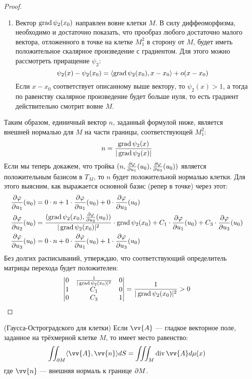 \begin{proof}
\begin{enumerate}
		\item Вектор $\operatorname{grad} \psi_2(x_0)$ направлен вовне клетки $M$. В силу диффеоморфизма, необходимо и достаточно показать, что прообраз любого достаточно малого вектора, отложенного в точке на клетке $M_1^2$ в сторону от $M$, будет иметь положительное скалярное произведение с градиентом. Для этого можно рассмотреть приращение $\psi_2$:
		\[
		\psi_2(x) - \psi_2(x_0) = \left\langle\operatorname{grad} \psi_2(x_0), x - x_0\right\rangle + o(x - x_0)
		\]
		Если $x - x_0$ соответствует описанному выше вектору, то $\psi_2(x) > 1$, а тогда по равенству скалярное произведение будет больше нуля, то есть градиент действительно смотрит вовне $M$.
	\end{enumerate}
	Таким образом, единичный вектор $n$, заданный формулой ниже, является внешней нормалью для $M$ на части границы, соответствующей $M_1^2$:
	\[
	n = \frac{\operatorname{grad} \psi_2(x)}{|\operatorname{grad} \psi_2(x)|}
	\]
	Если мы теперь докажем, что тройка $(n, \frac{\partial \varphi}{\partial u_1}(u_0), \frac{\partial \varphi}{\partial u_3}(u_0))$ является положительным базисом в $T_M$, то $n$ будет положительной нормалью клетки. Для этого выясним, как выражается основной базис (репер в точке) через этот:
	\begin{align*}
		&{\frac{\partial \varphi}{\partial u_1}(u_0) = 0 \cdot n + 1 \cdot \frac{\partial \varphi}{\partial u_1}(u_0) + 0 \cdot \frac{\partial \varphi}{\partial u_3}(u_0)}
		\\
		&{\frac{\partial \varphi}{\partial u_2}(u_0) = \frac{(\operatorname{grad} \psi_2(x_0), \frac{\partial \varphi}{\partial u_2}(u_0))}{|\operatorname{grad} \psi_2(x_0)|^2} \cdot \operatorname{grad} \psi_2(x_0)} + C_1 \cdot \frac{\partial \varphi}{\partial u_1}(u_0) + C_3 \cdot \frac{\partial \varphi}{\partial u_3}(u_0)
		\\
		&{\frac{\partial \varphi}{\partial u_3}(u_0) = 0 \cdot n + 0 \cdot \frac{\partial \varphi}{\partial u_1}(u_0) + 1 \cdot \frac{\partial \varphi}{\partial u_3}(u_0)}
	\end{align*}
	Без долгих расписываний, утверждаю, что соответствующий определитель матрицы перехода будет положителен:
	\[
	\begin{vmatrix}
		0 & \frac{1}{|\operatorname{grad} \psi_2(x_0)|^2} & 0
		\\
		1 & C_1 & 0
		\\
		0 & C_3 & 1
	\end{vmatrix} = \frac{1}{|\operatorname{grad} \psi_2(x_0)|^2} > 0
	\]
\end{proof}

\begin{theorem} (Гаусса-Остроградского для клетки)
	Если $\vv{A}$ --- гладкое векторное поле, заданное на трёхмерной клетке $M$, то имеет место равенство:
	\[
	\iint_{\vdelta M} \ntbr{\vv{A}, \vv{n}}dS = \iiint_M \Div \vv{A} d\mu(x)
	\]
	где $\vv{n}$ --- внешняя нормаль к границе $\partial M$.
\end{theorem}

